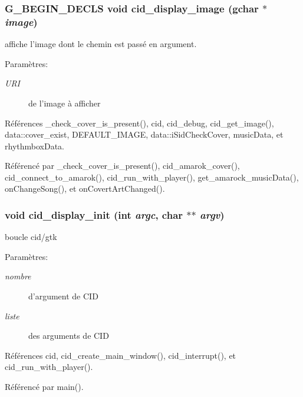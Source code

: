 \subsubsection{\setlength{\rightskip}{0pt plus 5cm}G\_\-BEGIN\_\-DECLS void cid\_\-display\_\-image (gchar $\ast$ {\em image})}\label{cid-main_8h_abcf6e9905ea41c95586e9e6be2e84a1}


affiche l'image dont le chemin est passé en argument. \begin{Desc}
\item[Paramètres:]
\begin{description}
\item[{\em URI}]de l'image à afficher \end{description}
\end{Desc}


Références \_\-check\_\-cover\_\-is\_\-present(), cid, cid\_\-debug, cid\_\-get\_\-image(), data::cover\_\-exist, DEFAULT\_\-IMAGE, data::iSidCheckCover, musicData, et rhythmboxData.

Référencé par \_\-check\_\-cover\_\-is\_\-present(), cid\_\-amarok\_\-cover(), cid\_\-connect\_\-to\_\-amarok(), cid\_\-run\_\-with\_\-player(), get\_\-amarock\_\-musicData(), onChangeSong(), et onCovertArtChanged().
\subsubsection{\setlength{\rightskip}{0pt plus 5cm}void cid\_\-display\_\-init (int {\em argc}, \/  char $\ast$$\ast$ {\em argv})}\label{cid-main_8h_6d1ca9236cd558391793807b8e817130}


boucle cid/gtk \begin{Desc}
\item[Paramètres:]
\begin{description}
\item[{\em nombre}]d'argument de CID \item[{\em liste}]des arguments de CID \end{description}
\end{Desc}


Références cid, cid\_\-create\_\-main\_\-window(), cid\_\-interrupt(), et cid\_\-run\_\-with\_\-player().

Référencé par main().
